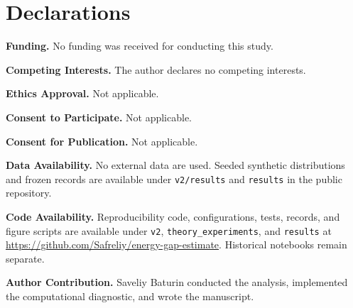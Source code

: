 \documentclass[smallextended,envcountsect]{svjour3}
\begin{document}
\section*{Declarations}

\textbf{Funding.} No funding was received for conducting this study.

\textbf{Competing Interests.} The author declares no competing interests.

\textbf{Ethics Approval.} Not applicable.

\textbf{Consent to Participate.} Not applicable.

\textbf{Consent for Publication.} Not applicable.

\textbf{Data Availability.} No external data are used. Seeded synthetic distributions and frozen records are available under \texttt{v2/results} and \texttt{results} in the public repository.

\textbf{Code Availability.} Reproducibility code, configurations, tests, records, and figure scripts are available under \texttt{v2}, \texttt{theory\_experiments}, and \texttt{results} at \url{https://github.com/Safreliy/energy-gap-estimate}. Historical notebooks remain separate.

\textbf{Author Contribution.} Saveliy Baturin conducted the analysis, implemented the computational diagnostic, and wrote the manuscript.



\end{document}
